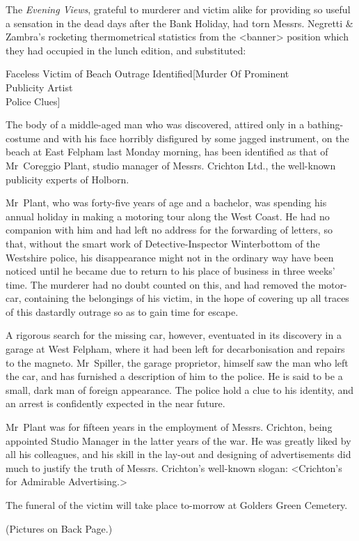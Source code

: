The \textit{Evening Views}, grateful to murderer and victim alike for providing so useful a sensation in the dead days after the Bank Holiday, had torn Messrs. Negretti \& Zambra's rocketing thermometrical statistics from the <banner> position which they had occupied in the lunch edition, and substituted:

\begin{newspaper}{Faceless Victim of Beach Outrage Identified}[Murder Of Prominent\\Publicity Artist\\Police Clues]

The body of a middle-aged man who was discovered, attired only in a bathing-costume and with his face horribly disfigured by some jagged instrument, on the beach at East Felpham last Monday morning, has been identified as that of Mr~Coreggio Plant, studio manager of Messrs. Crichton Ltd., the well-known publicity experts of Holborn.

Mr~Plant, who was forty-five years of age and a bachelor, was spending his annual holiday in making a motoring tour along the West Coast. He had no companion with him and had left no address for the forwarding of letters, so that, without the smart work of Detective-Inspector Winterbottom of the Westshire police, his disappearance might not in the ordinary way have been noticed until he became due to return to his place of business in three weeks' time. The murderer had no doubt counted on this, and had removed the motor-car, containing the belongings of his victim, in the hope of covering up all traces of this dastardly outrage so as to gain time for escape.

A rigorous search for the missing car, however, eventuated in its discovery in a garage at West Felpham, where it had been left for decarbonisation and repairs to the magneto. Mr~Spiller, the garage proprietor, himself saw the man who left the car, and has furnished a description of him to the police. He is said to be a small, dark man of foreign appearance. The police hold a clue to his identity, and an arrest is confidently expected in the near future.

Mr~Plant was for fifteen years in the employment of Messrs. Crichton, being appointed Studio Manager in the latter years of the war. He was greatly liked by all his colleagues, and his skill in the lay-out and designing of advertisements did much to justify the truth of Messrs. Crichton's well-known slogan: <Crichton's for Admirable Advertising.>

The funeral of the victim will take place to-morrow at Golders Green Cemetery.

(Pictures on Back Page.)
\end{newspaper}

